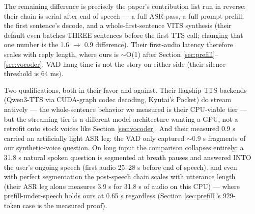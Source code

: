 \documentclass{article}
\begin{document}
The remaining difference is precisely the paper's contribution list run in reverse: their chain is serial after end of speech --- a full ASR pass, a full prompt prefill, the first sentence's decode, and a whole-first-sentence VITS synthesis (their default even batches THREE sentences before the first TTS call; changing that one number is the 1.6 $\rightarrow$ 0.9 difference). Their first-audio latency therefore scales with reply length, where ours is $\sim$O(1) after Section \ref{sec:prefill}--\ref{sec:vocoder}. VAD hang time is not the story on either side (their silence threshold is 64 ms).

Two qualifications, both in their favor and against. Their flagship TTS backends (Qwen3-TTS via CUDA-graph codec decoding, Kyutai's Pocket) do stream natively --- the whole-sentence behavior we measured is their CPU-viable tier --- but the streaming tier is a different model architecture wanting a GPU, not a retrofit onto stock voices like Section \ref{sec:vocoder}. And their measured 0.9 s carried an artificially light ASR leg: the VAD only captured $\sim$0.9 s fragments of our synthetic-voice question. On long input the comparison collapses entirely: a 31.8 s natural spoken question is segmented at breath pauses and answered INTO the user's ongoing speech (first audio 25--28 s before end of speech), and even with perfect segmentation the post-speech chain scales with utterance length (their ASR leg alone measures 3.9 s for 31.8 s of audio on this CPU) --- where prefill-under-speech holds ours at 0.65 s regardless (Section \ref{sec:prefill}'s 929-token case is the measured proof).
\end{document}
